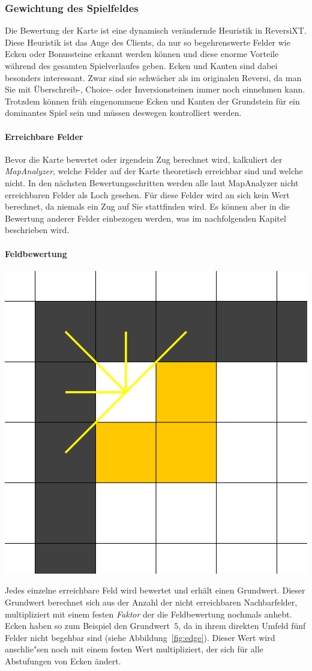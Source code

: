 \subsubsection{Gewichtung des Spielfeldes}\label{subsubsec:gewichtung-des-spielfeldes}
Die Bewertung der Karte ist eine dynamisch ver\"andernde Heuristik in ReversiXT.
Diese Heuristik ist das Auge des Clients, da nur so begehrenswerte Felder wie Ecken oder Bonussteine erkannt werden k\"onnen und diese enorme Vorteile w\"ahrend des gesamten Spielverlaufes geben.
Ecken und Kanten sind dabei besonders interessant.
Zwar sind sie schw\"acher als im originalen Reversi, da man Sie mit \"Uberschreib-, Choice- oder Inversionsteinen immer noch einnehmen kann.
Trotzdem k\"onnen fr\"uh eingenommene Ecken und Kanten der Grundstein f\"ur ein dominantes Spiel sein und m\"ussen deswegen kontrolliert werden.

\paragraph{Erreichbare Felder}
Bevor die Karte bewertet oder irgendein Zug berechnet wird, kalkuliert der \emph{MapAnalyzer}, welche Felder auf der Karte theoretisch erreichbar sind und welche nicht.
In den n\"achsten Bewertungsschritten werden alle laut MapAnalyzer nicht erreichbaren Felder als Loch gesehen.
F\"ur diese Felder wird an sich kein Wert berechnet, da niemals ein Zug auf Sie stattfinden wird.
Es k\"onnen aber in die Bewertung anderer Felder einbezogen werden, was im nachfolgenden Kapitel beschrieben wird.

\paragraph{Feldbewertung}
\vspace{1em}
\begin{minipage}{\linewidth}
    \centering
    \includegraphics[width=0.2\linewidth]{pics/edge}
    \label{fig:edge}
\end{minipage}
\vspace{1em}

Jedes einzelne erreichbare Feld wird bewertet und erh\"alt einen Grundwert.
Dieser Grundwert berechnet sich aus der Anzahl der nicht erreichbaren Nachbarfelder, multipliziert mit einem festen \emph{Faktor} der die Feldbewertung nochmals anhebt.
Ecken haben so zum Beispiel den Grundwert~$5$, da in ihrem direkten Umfeld f\"unf Felder nicht begehbar sind (siehe Abbildung~\ref{fig:edge}).
Dieser Wert wird anschlie"sen noch mit einem festen Wert multipliziert, der sich f\"ur alle Abstufungen von Ecken \"andert.

